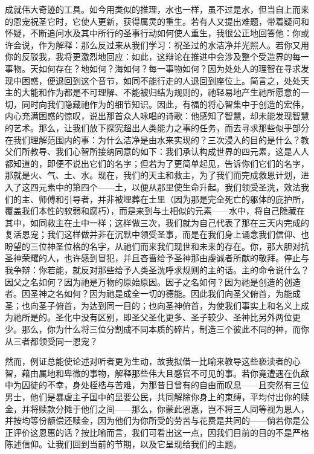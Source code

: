 成就伟大奇迹的工具。如今用类似的推理，水也一样，虽不过是水，但当自上而来的恩宠祝圣它时，它使人更新，获得属灵的重生。若有人又提出难题，带着疑问和怀疑，不断追问水及其中所行的圣事行动如何使人重生，我很公正地回答他：你或许会说，作为解释：那么反过来从我们学习：祝圣过的水洁净并光照人。若你又用你的反驳我，我将更激烈地回应：如此，这辩论在推进中会涉及整个受造界的每一事物。天如何存在？地如何？海如何？每一事物如何？因为处处人的理智在寻求发现中困惑，便退回到这个音节，如同不能行走的人退回到座位上。简言之，处处天主的大能和作为都是不可理解、不能被归结为规则的，祂轻易地产生祂所愿意的一切，同时向我们隐藏祂作为的细节知识。因此，有福的将心智集中于创造的宏伟，内心充满困惑的惊叹，说出那首众人咏唱的诗歌：他感知了智慧，却未能发现智慧的艺术。那么，让我们放下探究超出人类能力之事的任务，而去寻求那些似乎部分在我们理解范围内的事：为什么洁净是由水来实现的？三次浸入的目的是什么？教父们所教导、我们心智所接纳同意的如下：我们承认构成世界的四元素，这是人人都知道的，即便不说出它们的名字；但若为了更简单起见，告诉你们它们的名字，那就是火、气、土、水。现在，我们的天主和救主，为了我们而完成救恩计划，进入了这四元素中的第四个——土，以便从那里使生命升起。我们领受圣洗，效法我们的主、师傅和引导者，并非被埋葬在土里（因为那是完全死亡的躯体的庇护所，覆盖我们本性的软弱和腐朽），而是来到与土相似的元素——水中，将自己隐藏在其中，如同救主在土中一样；这样做三次，我们就为自己代表了那在三天内完成的复活恩宠；我们这样做并非在沉默中领受圣事，而是在我们身上诵念我们信仰、也盼望的三位神圣位格的名字，从祂们而来我们现世和未来的存在。你，那大胆对抗圣神荣耀的人，也许感到冒犯，并且吝啬给予圣神那由虔诚者所献的敬拜。停止与我争辩：你若能，就反对那些给予人类圣洗呼求规则的主的话。主的命令说什么？因父之名如何？因为祂是万物的原始原因。因子之名如何？因为祂是创造的创造者。因圣神之名如何？因为祂是成全一切的德能。因此我们向圣父俯首，为能成圣；也向圣子俯首，为达到同一目的；也向圣神俯首，为使我们事实上和名义上成为祂所是的。圣化中没有区别，即圣父圣化更多、圣子较少、圣神比另外两位更少。那么，你为什么将三位分割成不同本质的碎片，制造三个彼此不同的神，而你从三者都领受同一恩宠？\par

然而，例证总能使论述对听者更为生动，故我拟借一比喻来教导这些亵渎者的心智，藉由属地和卑微的事物，解释那些伟大且感官不可见的事。若你竟遭遇在仇敌中为囚徒的不幸，身处桎梏与苦难，为那昔日曾有的自由而叹息——且突然有三位男士，他们是暴虐主子国中的显要公民，共同解除你身上的束缚，平均付出你的赎金，并将赎款分摊于他们之间——那么，你蒙此恩惠，岂不将三人同等视为恩人，并按均等份额偿还赎金，因为他们为你所受的劳苦与花费是共同的——倘若你是公正评价这恩惠的话？按比喻而言，我们可看出这一点，因我们目前的目的不是严格陈述信仰。让我们回到当前的节期，以及它呈现给我们的主题。\par

